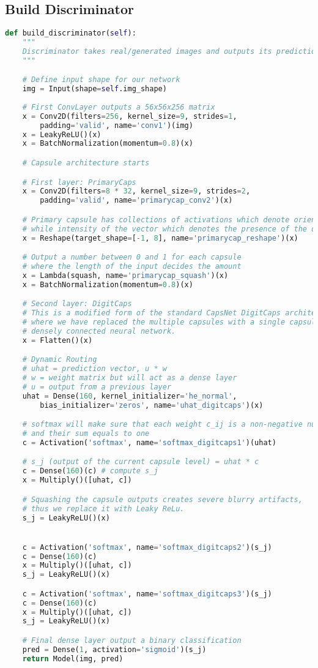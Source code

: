 \subsection{Build Discriminator} %
\label{subsec:building_discriminator}
\begin{lstlisting}[basicstyle=\scriptsize,language=Python]
def build_discriminator(self):
    """
    Discriminator takes real/generated images and outputs its prediction.
    """

    # Define input shape for our network
    img = Input(shape=self.img_shape)
    
    # First ConvLayer outputs a 56x56x256 matrix
    x = Conv2D(filters=256, kernel_size=9, strides=1, 
        padding='valid', name='conv1')(img)
    x = LeakyReLU()(x)
    x = BatchNormalization(momentum=0.8)(x)

    # Capsule architecture starts

    # First layer: PrimaryCaps
    x = Conv2D(filters=8 * 32, kernel_size=9, strides=2, 
        padding='valid', name='primarycap_conv2')(x)

    # Primary capsule has collections of activations which denote orientation
    # while intensity of the vector which denotes the presence of the digit)
    x = Reshape(target_shape=[-1, 8], name='primarycap_reshape')(x)

    # Output a number between 0 and 1 for each capsule 
    # where the length of the input decides the amount
    x = Lambda(squash, name='primarycap_squash')(x)
    x = BatchNormalization(momentum=0.8)(x)

    # Second layer: DigitCaps
    # This is a modified form of the standard CapsNet DigitCaps architecture 
    # where we have replaced the multiple capsules with a single capsule of 
    # densely connected neural network.
    x = Flatten()(x)

    # Dynamic Routing
    # uhat = prediction vector, u * w
    # w = weight matrix but will act as a dense layer
    # u = output from a previous layer
    uhat = Dense(160, kernel_initializer='he_normal', 
        bias_initializer='zeros', name='uhat_digitcaps')(x)

    # softmax will make sure that each weight c_ij is a non-negative number 
    # and their sum equals to one
    c = Activation('softmax', name='softmax_digitcaps1')(uhat) 

    # s_j (output of the current capsule level) = uhat * c
    c = Dense(160)(c) # compute s_j
    x = Multiply()([uhat, c])

    # Squashing the capsule outputs creates severe blurry artifacts, 
    # thus we replace it with Leaky ReLu.
    s_j = LeakyReLU()(x)


    c = Activation('softmax', name='softmax_digitcaps2')(s_j) 
    c = Dense(160)(c)
    x = Multiply()([uhat, c])
    s_j = LeakyReLU()(x)

    c = Activation('softmax', name='softmax_digitcaps3')(s_j) 
    c = Dense(160)(c)
    x = Multiply()([uhat, c])
    s_j = LeakyReLU()(x)

    # Final dense layer output a binary classification
    pred = Dense(1, activation='sigmoid')(s_j)
    return Model(img, pred)
\end{lstlisting}
